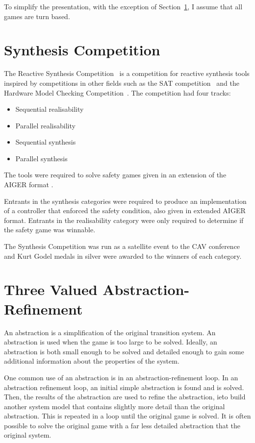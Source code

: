 
To simplify the presentation, with the exception of Section~\ref{sec:syntcomp}, I assume that all games are turn based.

\section{Synthesis Competition}
\label{sec:syntcomp}

The Reactive Synthesis Competition~\cite{} is a competition for reactive synthesis tools inspired by competitions in other fields such as the SAT competition~\cite{} and the Hardware Model Checking Competition~\cite{}. The competition had four tracks:
\begin{itemize}
    \item Sequential realisability
    \item Parallel realisability
    \item Sequential synthesis
    \item Parallel synthesis
\end{itemize}

The tools were required to solve safety games given in an extension of the AIGER format \cite{aiger}. 

Entrants in the synthesis categories were required to produce an implementation of a controller that enforced the safety condition, also given in extended AIGER format. Entrants in the realisability category were only required to determine if the safety game was winnable.

The Synthesis Competition was run as a satellite event to the CAV conference and Kurt Godel medals in silver were awarded to the winners of each category.



\section{Three Valued Abstraction-Refinement}
An abstraction is a simplification of the original transition system. An abstraction is used when the game is too large to be solved. Ideally, an abstraction is both small enough to be solved and detailed enough to gain some additional information about the properties of the system. 

One common use of an abstraction is in an abstraction-refinement loop. In an abstraction refinement loop, an initial simple abstraction is found and is solved. Then, the results of the abstraction are used to refine the abstraction, ie\. to build another system model that contains slightly more detail than the original abstraction. This is repeated in a loop until the original game is solved. It is often possible to solve the original game with a far less detailed abstraction that the original system. 

